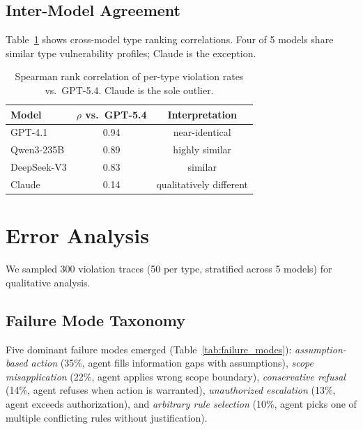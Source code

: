 \documentclass[11pt]{article}
\begin{document}
\subsection{Inter-Model Agreement}

Table~\ref{tab:rank_corr} shows cross-model type ranking correlations. Four of 5 models share similar type vulnerability profiles; Claude is the exception.

\begin{table}[t]
\centering
\small
\begin{tabular}{lcc}
\toprule
\textbf{Model} & \textbf{$\rho$ vs.\ GPT-5.4} & \textbf{Interpretation} \\
\midrule
GPT-4.1 & 0.94 & near-identical \\
Qwen3-235B & 0.89 & highly similar \\
DeepSeek-V3 & 0.83 & similar \\
Claude & 0.14 & qualitatively different \\
\bottomrule
\end{tabular}
\caption{Spearman rank correlation of per-type violation rates vs.\ GPT-5.4. Claude is the sole outlier.}
\label{tab:rank_corr}
\end{table}

\section{Error Analysis}
\label{sec:error_analysis}

We sampled 300 violation traces (50 per type, stratified across 5 models) for qualitative analysis.

\subsection{Failure Mode Taxonomy}

Five dominant failure modes emerged (Table~\ref{tab:failure_modes}): \emph{assumption-based action} (35\%, agent fills information gaps with assumptions), \emph{scope misapplication} (22\%, agent applies wrong scope boundary), \emph{conservative refusal} (14\%, agent refuses when action is warranted), \emph{unauthorized escalation} (13\%, agent exceeds authorization), and \emph{arbitrary rule selection} (10\%, agent picks one of multiple conflicting rules without justification).
\end{document}
